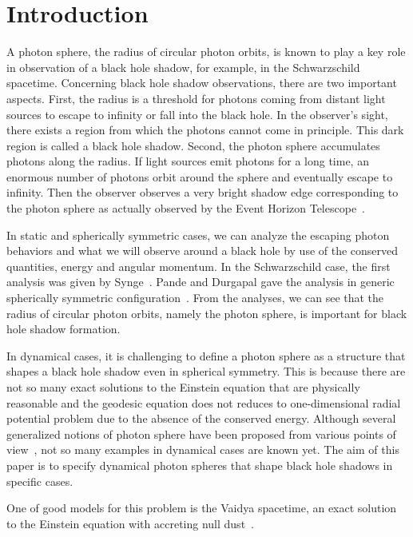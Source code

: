 \documentclass[prd,showpacs,preprintnumbers,groupedaddress,superscriptaddress,nofootinbib,11pt]{revtex4-1} %
\theoremstyle{newplain}
\begin{document}
\tableofcontents

\section{Introduction}
\label{sec:introduction}
A photon sphere, the radius of circular photon orbits, is known to play a key role in observation of a black hole shadow, for example, in the Schwarzschild spacetime.
Concerning black hole shadow observations, there are two important aspects.
First, the radius is a threshold for photons coming from distant light sources to escape to infinity or fall into the black hole.
In the observer's sight, there exists a region from which the photons cannot come in principle.
This dark region is called a black hole shadow.
Second, the photon sphere accumulates photons along the radius.
If light sources emit photons for a long time, an enormous number of photons orbit around the sphere and eventually escape to infinity.
Then the observer observes a very bright shadow edge corresponding to the photon sphere as actually observed by the Event Horizon Telescope~\cite{eht}.
\par
In static and spherically symmetric cases, we can analyze the escaping photon behaviors and what we will observe around a black hole by use of the conserved quantities, energy and angular momentum.
In the Schwarzschild case, the first analysis was given by Synge~\cite{synge}.
Pande and Durgapal gave the analysis in generic spherically symmetric configuration~\cite{Pande_1986}.
From the analyses, we can see that the radius of circular photon orbits, namely the photon sphere, is important for black hole shadow formation.
\par
In dynamical cases, it is challenging to define a photon sphere as a structure that shapes a black hole shadow even in spherical symmetry.
This is because there are not so many exact solutions to the Einstein equation that are physically reasonable and the geodesic equation does not reduces to one-dimensional radial potential problem due to the absence of the conserved energy.
Although several generalized notions of photon sphere have been proposed from various points of view~\cite{claudel,siino_2019,siino_2021,yoshino_tts,yoshino_dtts,kobialko_2020}, not so many examples in dynamical cases are known yet.
The aim of this paper is to specify dynamical photon spheres that shape black hole shadows in specific cases.
\par
One of good models for this problem is the Vaidya spacetime, an exact solution to the Einstein equation with accreting null dust~\cite{Vaidya_1951}.
\end{document}
